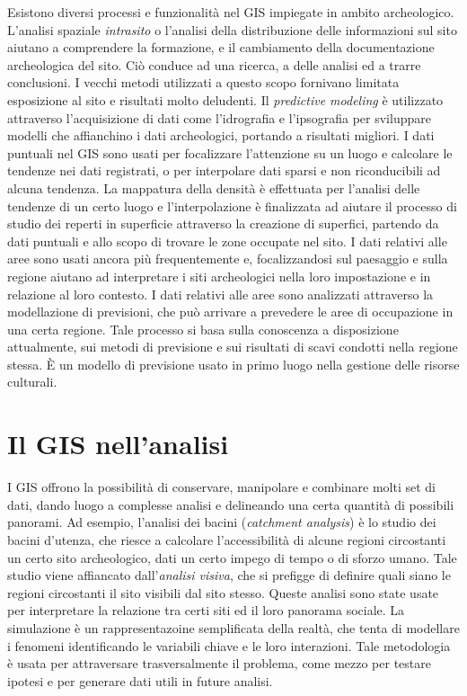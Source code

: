 	Esistono diversi processi e funzionalità nel GIS impiegate in ambito archeologico. L'analisi spaziale \emph{intrasito} o l'analisi della distribuzione delle informazioni sul sito aiutano a comprendere la formazione, e il cambiamento della documentazione archeologica del sito. Ciò conduce ad una ricerca, a delle analisi ed a trarre conclusioni.  I vecchi metodi utilizzati a questo scopo fornivano limitata esposizione al sito e risultati molto deludenti. Il \emph{predictive modeling} è utilizzato attraverso l'acquisizione di dati come l'idrografia e l'ipsografia per sviluppare modelli che affianchino i dati archeologici, portando a risultati migliori. I dati puntuali nel GIS sono usati per focalizzare l'attenzione su un luogo e calcolare le tendenze nei dati registrati, o per interpolare dati sparsi e non riconducibili ad alcuna tendenza. La mappatura della densità è effettuata per l'analisi delle tendenze di un certo luogo e l'interpolazione è finalizzata ad aiutare il processo di studio dei reperti in superficie attraverso la creazione di superfici, partendo da dati puntuali e allo scopo di trovare le zone occupate nel sito. I dati relativi alle aree sono usati ancora più frequentemente e, focalizzandosi sul paesaggio e sulla regione aiutano ad interpretare i siti archeologici nella loro impostazione e in relazione al loro contesto. I dati relativi alle aree sono analizzati attraverso la modellazione di previsioni, che può arrivare a prevedere le aree di occupazione in una certa regione.  Tale processo si basa sulla conoscenza a disposizione attualmente, sui metodi di previsione e sui risultati di scavi condotti nella regione stessa. È un modello di previsione usato in primo luogo nella gestione delle risorse culturali.


\section{Il GIS nell'analisi}
	I GIS offrono la possibilità di conservare, manipolare e combinare molti set di dati, dando luogo a complesse analisi e delineando una certa quantità di possibili panorami. Ad esempio, l'analisi dei bacini (\emph{catchment analysis}) è lo studio dei bacini d'utenza, che riesce a calcolare l'accessibilità di alcune regioni circostanti un certo sito archeologico, dati un certo impego di tempo o di sforzo umano.  Tale studio viene affiancato dall'\emph{analisi visiva}, che si prefigge di definire quali siano le regioni circostanti il sito visibili dal sito stesso. Queste analisi sono state usate per interpretare la relazione tra certi siti ed il loro panorama sociale. La simulazione è un rappresentazoine semplificata della realtà, che tenta di modellare i fenomeni identificando le variabili chiave e le loro interazioni. Tale metodologia è usata per attraversare trasversalmente il problema, come mezzo per testare ipotesi e per generare dati utili in future analisi.

